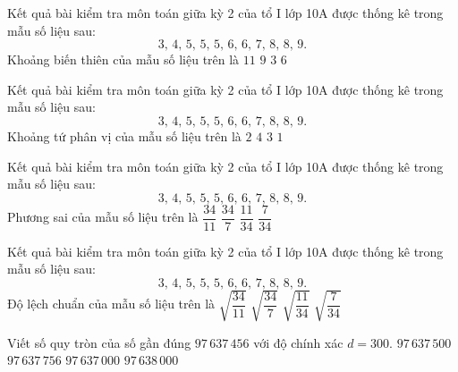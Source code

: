 \begin{ex}%
Kết quả bài kiểm tra môn toán giữa kỳ 2 của tổ I lớp 10A được thống kê trong mẫu số liệu sau:
\[3,\,4,\,5,\,5,\,5,\,6,\,6,\,7,\,8,\,8,\,9.\]
Khoảng biến thiên của mẫu số liệu trên là
\choice
{$11$}
{$9$}
{$3$}
{\True $6$}
\end{ex}
\begin{ex}%
Kết quả bài kiểm tra môn toán giữa kỳ 2 của tổ I lớp 10A được thống kê trong mẫu số liệu sau:
\[3,\,4,\,5,\,5,\,5,\,6,\,6,\,7,\,8,\,8,\,9.\]
Khoảng tứ phân vị của mẫu số liệu trên là
\choice
{$2$}
{$4$}
{\True $3$}
{$1$}
\end{ex}
\begin{ex}%
Kết quả bài kiểm tra môn toán giữa kỳ 2 của tổ I lớp 10A được thống kê trong mẫu số liệu sau:
\[3,\,4,\,5,\,5,\,5,\,6,\,6,\,7,\,8,\,8,\,9.\]
Phương sai của mẫu số liệu trên là
\choice
{\True $\dfrac{34}{11}$}
{$\dfrac{34}{7}$}
{$\dfrac{11}{34}$}
{$\dfrac{7}{34}$}
\end{ex}
\begin{ex}%
Kết quả bài kiểm tra môn toán giữa kỳ 2 của tổ I lớp 10A được thống kê trong mẫu số liệu sau:
\[3,\,4,\,5,\,5,\,5,\,6,\,6,\,7,\,8,\,8,\,9.\]
Độ lệch chuẩn của mẫu số liệu trên là
\choice
{\True $\sqrt{\dfrac{34}{11}}$}
{$\sqrt{\dfrac{34}{7}}$}
{$\sqrt{\dfrac{11}{34}}$}
{$\sqrt{\dfrac{7}{34}}$}
\end{ex}
\begin{ex}%
Viết số quy tròn của số gần đúng $97\,637\,456$ với độ chính xác $d=300$.
\choice
{$97\,637\,500$}
{$97\,637\,756$}
{\True $97\,637\,000$}
{$97\,638\,000$}
\end{ex}
